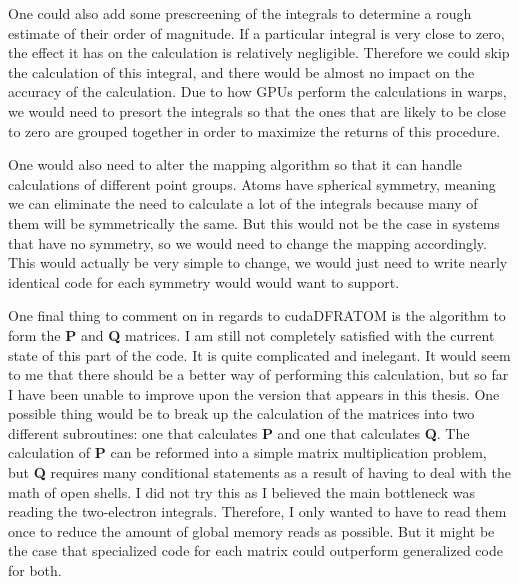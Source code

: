 One could also add some prescreening of the integrals to determine a rough estimate of their order of magnitude. If a particular integral is very close to zero, the effect it has on the calculation is relatively negligible. Therefore we could skip the calculation of this integral, and there would be almost no impact on the accuracy of the calculation. Due to how GPUs perform the calculations in warps, we would need to presort the integrals so that the ones that are likely to be close to zero are grouped together in order to maximize the returns of this procedure.

One would also need to alter the mapping algorithm so that it can handle calculations of different point groups. Atoms have spherical symmetry, meaning we can eliminate the need to calculate a lot of the integrals because many of them will be symmetrically the same. But this would not be the case in systems that have no symmetry, so we would need to change the mapping accordingly. This would actually be very simple to change, we would just need to write nearly identical code for each symmetry would would want to support.

One final thing to comment on in regards to cudaDFRATOM is the algorithm to form the \textbf{P} and \textbf{Q} matrices. I am still not completely satisfied with the current state of this part of the code. It is quite complicated and inelegant. It would seem to me that there should be a better way of performing this calculation, but so far I have been unable to improve upon the version that appears in this thesis. One possible thing would be to break up the calculation of the matrices into two different subroutines: one that calculates \textbf{P} and one that calculates \textbf{Q}. The calculation of \textbf{P} can be reformed into a simple matrix multiplication problem, but \textbf{Q} requires many conditional statements as a result of having to deal with the math of open shells. I did not try this as I believed the main bottleneck was reading the two-electron integrals. Therefore, I only wanted to have to read them once to reduce the amount of global memory reads as possible. But it might be the case that specialized code for each matrix could outperform generalized code for both.

